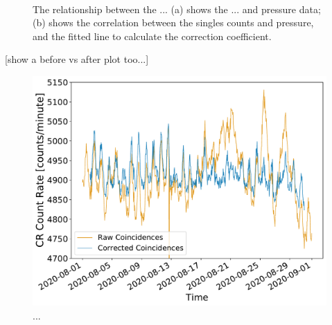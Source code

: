 \begin{figure}[ht!]
	\centering
	 \\
	
	\caption{The relationship between the ... (a) shows the ... and pressure data; (b) shows the correlation between the singles counts and pressure, and the fitted line to calculate the correction coefficient.}
	\label{fig:14008_CR_V_P_corr}
\end{figure}


[show a before vs after plot too...]


\begin{figure}[ht!]
	\centering
	\includegraphics[width=0.75\columnwidth]{raw_vs_corrected_coincidences.pdf}
	\caption{...}
	\label{fig:HS_14008_corrected_coincidences}
\end{figure}



